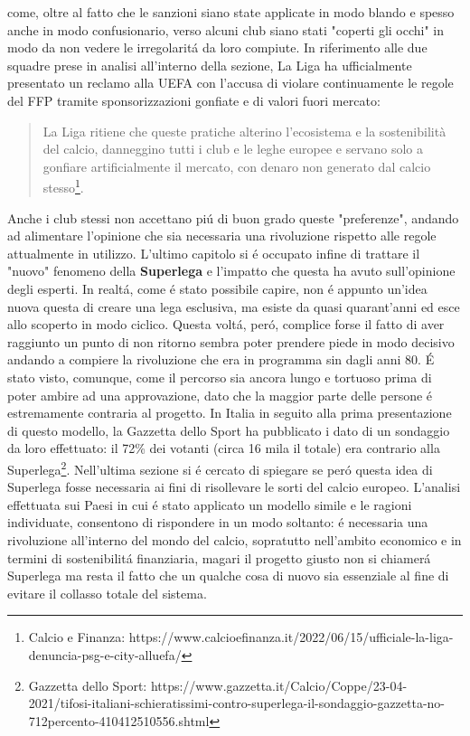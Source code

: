 \documentclass[
    corpo=12pt,
    oneside,
    evenboxes,
    tipotesi=triennale,
    stile=classica,
    oldstyle,
    autoretitolo,
    greek,
]{toptesi}
\begin{document}
\begin{interlinea}{1.5}
come, oltre al fatto che le sanzioni siano state applicate in modo blando e spesso anche in modo confusionario, verso alcuni club siano stati "coperti gli occhi" 
in modo da non vedere le irregolarit\'a da loro compiute. In riferimento alle due squadre prese in analisi all'interno della sezione, La Liga ha ufficialmente
presentato un reclamo alla UEFA con l'accusa di violare continuamente le regole del FFP tramite sponsorizzazioni gonfiate e di valori fuori mercato: \begin{quote}\small
    La Liga ritiene che queste pratiche alterino l’ecosistema e la sostenibilità del calcio, danneggino tutti i club e le leghe europee e servano solo a gonfiare artificialmente il mercato, con denaro non generato dal calcio stesso\footnote{Calcio e Finanza: https://www.calcioefinanza.it/2022/06/15/ufficiale-la-liga-denuncia-psg-e-city-alluefa/}.
\end{quote}
Anche i club stessi non accettano pi\'u di buon grado queste "preferenze", andando ad alimentare l'opinione che sia necessaria una rivoluzione rispetto
alle regole attualmente in utilizzo.\newline
L'ultimo capitolo si \'e occupato infine di trattare il "nuovo" fenomeno della \textbf{Superlega} e l'impatto che questa ha avuto sull'opinione
degli esperti. In realt\'a, come \'e stato possibile capire, non \'e appunto un'idea nuova questa di creare una lega esclusiva, ma esiste da 
quasi quarant'anni ed esce allo scoperto in modo ciclico. Questa volt\'a, per\'o, complice forse il fatto di aver raggiunto un punto di non ritorno 
sembra poter prendere piede in modo decisivo andando a compiere la rivoluzione che era in programma sin dagli anni 80. \'E stato visto, comunque,
come il percorso sia ancora lungo e tortuoso prima di poter ambire ad una approvazione, dato che la maggior parte delle persone \'e estremamente contraria 
al progetto. In Italia in seguito alla prima presentazione di questo modello, la Gazzetta dello Sport ha pubblicato i dato di un sondaggio da loro effettuato:
il 72\% dei votanti (circa 16 mila il totale) era contrario alla Superlega\footnote{Gazzetta dello Sport: https://www.gazzetta.it/Calcio/Coppe/23-04-2021/tifosi-italiani-schieratissimi-contro-superlega-il-sondaggio-gazzetta-no-712percento-410412510556.shtml}.
Nell'ultima sezione si \'e cercato di spiegare se per\'o questa idea di Superlega fosse necessaria ai fini di risollevare le sorti del calcio europeo. 
L'analisi effettuata sui Paesi in cui \'e stato applicato un modello simile e le ragioni individuate, consentono di rispondere in un modo soltanto: \'e 
necessaria una rivoluzione all'interno del mondo del calcio, sopratutto nell'ambito economico e in termini di sostenibilit\'a finanziaria, magari 
il progetto giusto non si chiamer\'a Superlega ma resta il fatto che un qualche cosa di nuovo sia essenziale al fine di evitare il collasso totale del sistema.


\end{interlinea}
\end{document}
